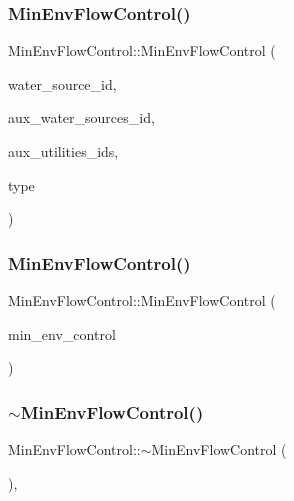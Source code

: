\subsubsection{\texorpdfstring{Min\+Env\+Flow\+Control()}{MinEnvFlowControl()}\hspace{0.1cm}{\footnotesize\ttfamily [1/2]}}
{\footnotesize\ttfamily Min\+Env\+Flow\+Control\+::\+Min\+Env\+Flow\+Control (\begin{DoxyParamCaption}\item[{int}]{water\+\_\+source\+\_\+id,  }\item[{const vector$<$ int $>$ \&}]{aux\+\_\+water\+\_\+sources\+\_\+id,  }\item[{const vector$<$ int $>$ \&}]{aux\+\_\+utilities\+\_\+ids,  }\item[{int}]{type }\end{DoxyParamCaption})}

\mbox{\label{classMinEnvFlowControl_a0e12d2b8583a539d200acfc5fac795b6}} 
\subsubsection{\texorpdfstring{Min\+Env\+Flow\+Control()}{MinEnvFlowControl()}\hspace{0.1cm}{\footnotesize\ttfamily [2/2]}}
{\footnotesize\ttfamily Min\+Env\+Flow\+Control\+::\+Min\+Env\+Flow\+Control (\begin{DoxyParamCaption}\item[{const \mbox{\hyperlink{classMinEnvFlowControl}{Min\+Env\+Flow\+Control}} \&}]{min\+\_\+env\+\_\+control }\end{DoxyParamCaption})}

\mbox{\label{classMinEnvFlowControl_a809d1552ea730c607dbc73937eb70a6a}} 
\subsubsection{\texorpdfstring{$\sim$\+Min\+Env\+Flow\+Control()}{~MinEnvFlowControl()}}
{\footnotesize\ttfamily Min\+Env\+Flow\+Control\+::$\sim$\+Min\+Env\+Flow\+Control (\begin{DoxyParamCaption}{ }\end{DoxyParamCaption})\hspace{0.3cm}{\ttfamily [virtual]}, {\ttfamily [default]}}



